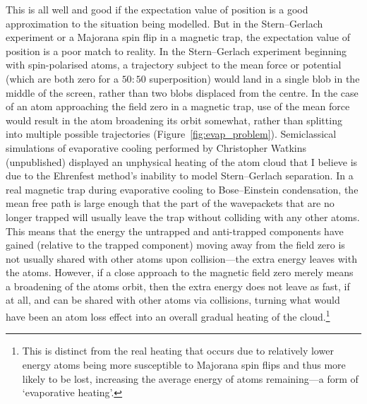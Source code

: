 This is all well and good if the expectation value of position is a good approximation to the situation being modelled. But in the Stern--Gerlach experiment or a Majorana spin flip in a magnetic trap, the expectation value of position is a poor match to reality. In the Stern--Gerlach experiment beginning with spin-polarised atoms, a trajectory subject to the mean force or potential (which are both zero for a $50:50$ superposition) would land in a single blob in the middle of the screen, rather than two blobs displaced from the centre. In the case of an atom approaching the field zero in a magnetic trap, use of the mean force would result in the atom broadening its orbit somewhat, rather than splitting into multiple possible trajectories (Figure~\ref{fig:evap_problem}). Semiclassical simulations of evaporative cooling performed by Christopher Watkins (unpublished) displayed an unphysical heating of the atom cloud that I believe is due to the Ehrenfest method's inability to model Stern--Gerlach separation. In a real magnetic trap during evaporative cooling to Bose--Einstein condensation, the mean free path is large enough that the part of the wavepackets that are no longer trapped will usually leave the trap without colliding with any other atoms. This means that the energy the untrapped and anti-trapped components have gained (relative to the trapped component) moving away from the field zero is not usually shared with other atoms upon collision---the extra energy leaves with the atoms. However, if a close approach to the magnetic field zero merely means a broadening of the atoms orbit, then the extra energy does not leave as fast, if at all, and can be shared with other atoms via collisions, turning what would have been an atom loss effect into an overall gradual heating of the cloud.\footnote{This is distinct from the real heating that occurs due to relatively lower energy atoms being more susceptible to Majorana spin flips and thus more likely to be lost, increasing the average energy of atoms remaining---a form of `evaporative heating'.} 

